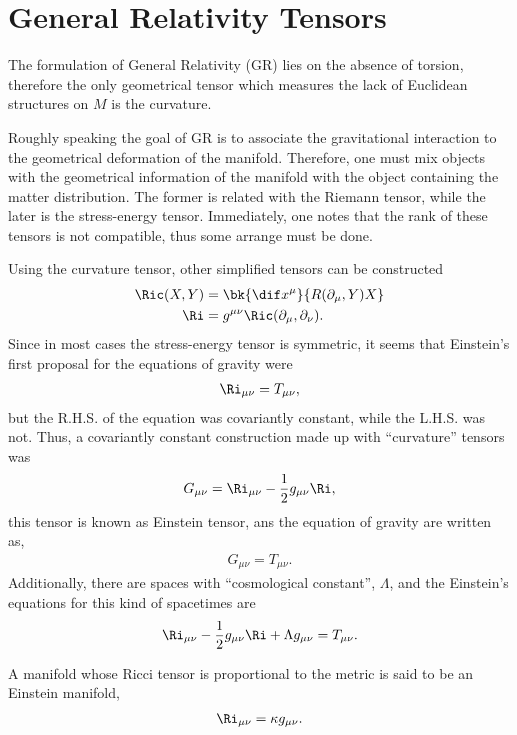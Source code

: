 \section{General Relativity Tensors}

The formulation of General Relativity (GR) lies on the absence of torsion, therefore the only geometrical tensor which measures the lack of Euclidean structures on $M$ is the curvature.

Roughly speaking the goal of GR is to associate the gravitational interaction to the geometrical deformation of the manifold. Therefore, one must mix objects with the geometrical information of the manifold with the object containing the matter distribution. The former is related with the Riemann tensor, while the later is the stress-energy tensor. Immediately, one notes that the rank of these tensors is not compatible, thus some arrange must be done.

Using the curvature tensor, other simplified tensors can be constructed
\begin{align}
  \Ric(X,Y) &= \bk{\dif x^\mu}{R(\partial_\mu,Y)X}\\
  \Ri &= g^{\mu \nu}\Ric(\partial_\mu,\partial_\nu).
\end{align}
Since in most cases the stress-energy tensor is symmetric, it seems that Einstein's first proposal for the equations of gravity were
\begin{align}
  \Ri_{\mu\nu}=T_{\mu\nu},
\end{align}
but the R.H.S. of the equation was covariantly constant, while the L.H.S. was not. Thus, a covariantly constant construction made up with ``curvature'' tensors was
\begin{align}
  G_{\mu\nu} = \Ri_{\mu\nu}-\frac{1}{2}g_{\mu\nu}\Ri,
\end{align}
this tensor is known as Einstein tensor, ans the equation of gravity are written as,
\begin{align}
  G_{\mu\nu}= T_{\mu\nu}.
\end{align}
Additionally, there are spaces with ``cosmological constant'', $\Lambda$, and the Einstein's equations for this kind of spacetimes are
\begin{align}
  \Ri_{\mu\nu}-\frac{1}{2}g_{\mu\nu}\Ri + \Lambda g_{\mu\nu}= T_{\mu\nu}.
\end{align}

A manifold whose Ricci tensor is proportional to the metric is said to be an Einstein manifold,
\begin{align}
  \Ri_{\mu\nu} = \kappa g_{\mu\nu}.\label{def-const-curv}
\end{align}

